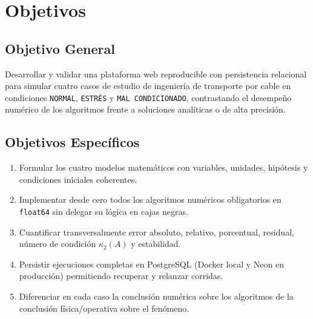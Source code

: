 \documentclass[11pt,a4paper]{article}
\begin{document}
\section{Objetivos}
\subsection*{Objetivo General}
Desarrollar y validar una plataforma web reproducible con persistencia relacional para simular cuatro casos de estudio de ingeniería de transporte por cable en condiciones \texttt{NORMAL}, \texttt{ESTRÉS} y \texttt{MAL CONDICIONADO}, contrastando el desempeño numérico de los algoritmos frente a soluciones analíticas o de alta precisión.

\subsection*{Objetivos Específicos}
\begin{enumerate}[noitemsep]
    \item Formular los cuatro modelos matemáticos con variables, unidades, hipótesis y condiciones iniciales coherentes.
    \item Implementar desde cero todos los algoritmos numéricos obligatorios en \texttt{float64} sin delegar su lógica en cajas negras.
    \item Cuantificar transversalmente error absoluto, relativo, porcentual, residual, número de condición $\kappa_2(A)$ y estabilidad.
    \item Persistir ejecuciones completas en PostgreSQL (Docker local y Neon en producción) permitiendo recuperar y relanzar corridas.
    \item Diferenciar en cada caso la conclusión numérica sobre los algoritmos de la conclusión física/operativa sobre el fenómeno.
\end{enumerate}

\end{document}
